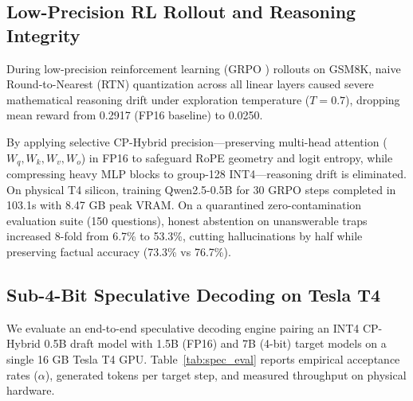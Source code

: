 \documentclass[10pt,twocolumn,letterpaper]{article}
\begin{document}
\subsection{Low-Precision RL Rollout and Reasoning Integrity}
During low-precision reinforcement learning (GRPO \cite{kumar2024grpo}) rollouts on GSM8K, naive Round-to-Nearest (RTN) quantization across all linear layers caused severe mathematical reasoning drift under exploration temperature ($T=0.7$), dropping mean reward from 0.2917 (FP16 baseline) to 0.0250. 

By applying selective CP-Hybrid precision---preserving multi-head attention ($W_q, W_k, W_v, W_o$) in FP16 to safeguard RoPE geometry and logit entropy, while compressing heavy MLP blocks to group-128 INT4---reasoning drift is eliminated. On physical T4 silicon, training Qwen2.5-0.5B for 30 GRPO steps completed in 103.1s with 8.47 GB peak VRAM. On a quarantined zero-contamination evaluation suite (150 questions), honest abstention on unanswerable traps increased 8-fold from 6.7\% to 53.3\%, cutting hallucinations by half while preserving factual accuracy (73.3\% vs 76.7\%).

\subsection{Sub-4-Bit Speculative Decoding on Tesla T4}
We evaluate an end-to-end speculative decoding engine \cite{cai2024medusa, li2024eagle} pairing an INT4 CP-Hybrid 0.5B draft model with 1.5B (FP16) and 7B (4-bit) target models on a single 16 GB Tesla T4 GPU. Table~\ref{tab:spec_eval} reports empirical acceptance rates ($\alpha$), generated tokens per target step, and measured throughput on physical hardware.
\end{document}
